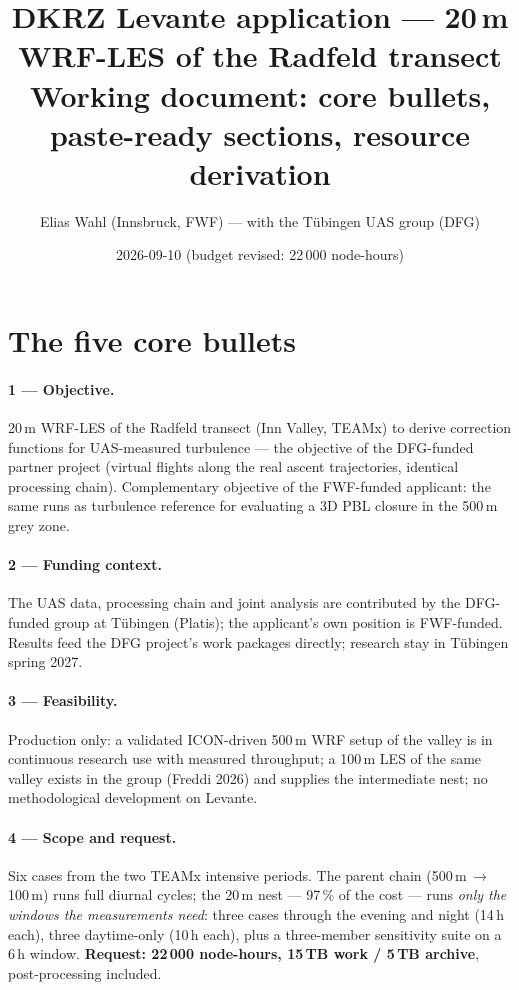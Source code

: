 \documentclass[10pt,a4paper]{article}
\title{\vspace{-1.5em}DKRZ Levante application --- 20\,m WRF-LES of the Radfeld transect\\
\large Working document: core bullets, paste-ready sections, resource derivation}
\author{Elias Wahl (Innsbruck, FWF) --- with the Tübingen UAS group (DFG)}
\date{2026-09-10 (budget revised: 22\,000 node-hours)}
\begin{document}
\maketitle

\section*{The five core bullets}

\paragraph{1 --- Objective.} 20\,m WRF-LES of the Radfeld transect (Inn Valley,
TEAMx) to derive correction functions for UAS-measured turbulence --- the
objective of the DFG-funded partner project (virtual flights along the real
ascent trajectories, identical processing chain). Complementary objective of
the FWF-funded applicant: the same runs as turbulence reference for evaluating
a 3D PBL closure in the 500\,m grey zone.

\paragraph{2 --- Funding context.} The UAS data, processing chain and joint
analysis are contributed by the DFG-funded group at Tübingen (Platis); the
applicant's own position is FWF-funded. Results feed the DFG project's work
packages directly; research stay in Tübingen spring 2027.

\paragraph{3 --- Feasibility.} Production only: a validated ICON-driven 500\,m
WRF setup of the valley is in continuous research use with measured
throughput; a 100\,m LES of the same valley exists in the group (Freddi 2026)
and supplies the intermediate nest; no methodological development on Levante.

\paragraph{4 --- Scope and request.} Six cases from the two TEAMx intensive
periods. The parent chain (500\,m\,$\to$\,100\,m) runs full diurnal cycles;
the 20\,m nest --- 97\,\% of the cost --- runs \emph{only the windows the
measurements need}: three cases through the evening and night (14\,h each),
three daytime-only (10\,h each), plus a three-member sensitivity suite on a
6\,h window. \textbf{Request: 22\,000 node-hours, 15\,TB work / 5\,TB
archive}, post-processing included.
\end{document}
